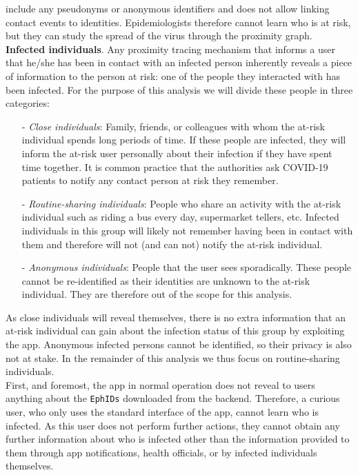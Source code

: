 \documentclass[12pt,a4paper]{article}
\begin{document}
include any pseudonyms or anonymous identifiers and does not allow linking contact events
to identities. Epidemiologists therefore cannot learn who is at risk, but they can study the spread of the virus through the proximity graph.\\[0.3cm]
\textbf{Infected individuals}. Any proximity tracing mechanism that informs a user that he/she has been in contact with an infected person inherently reveals a piece of information to the person at risk: one of the people they interacted with has been infected. For the purpose of this analysis we will divide these people in three categories: 
\begin{itemize}\itemsep0pt
\item[-] \textit{Close individuals}: Family, friends, or colleagues with whom the at-risk individual spends long periods of time. If these people are infected, they will inform the at-risk user personally about their infection if they have spent time together. It is common practice that the authorities ask COVID-19 patients to notify any contact person at
risk they remember.
\item[-] \textit{Routine-sharing individuals}: People who share an activity with the at-risk individual such as riding a bus every day, supermarket tellers, etc. Infected individuals in this group will likely not remember having been in contact with them and therefore will not (and can not) notify the at-risk individual.
\item[-] \textit{Anonymous individuals}: People that the user sees sporadically. These people cannot be re-identified as their identities are unknown to the at-risk individual. They are therefore out of the scope for this analysis.
\end{itemize}
As close individuals will reveal themselves, there is no extra information that an at-risk
individual can gain about the infection status of this group by exploiting the app. Anonymous infected persons cannot be identified, so their privacy is also not at stake. In the remainder of this analysis we thus focus on routine-sharing individuals.\\[0.3cm]
First, and foremost, the app in normal operation does not reveal to users anything about the \texttt{EphIDs} downloaded from the backend. Therefore, a curious user, who only uses the standard interface of the app, cannot learn who is infected. As this user does not perform further actions, they cannot obtain any further information about who is infected other than the information provided to them through app notifications, health officials, or by infected individuals themselves.\\[0.3cm]
\end{document}
